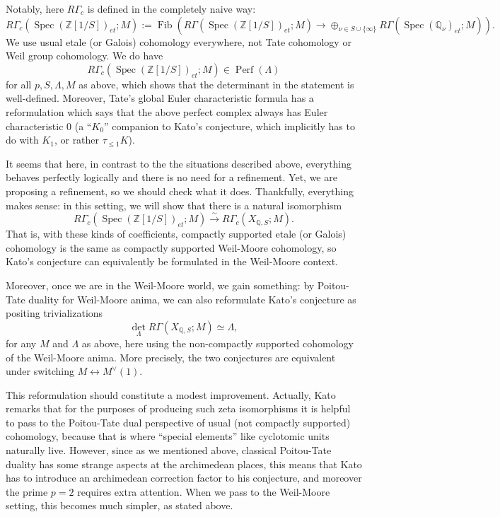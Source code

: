 \documentclass[12pt]{article}
\theoremstyle{definition}
\newcommand{\on}{\operatorname}
\newcommand{\mbb}{\mathbb}
\begin{document}
\begin{enumerate}
Notably, here $R\Gamma_c$ is defined in the completely naive way:
$$R\Gamma_c(\on{Spec}(\mbb{Z}[1/S])_{et};M) := \on{Fib}(R\Gamma (\on{Spec}(\mbb{Z}[1/S])_{et};M)\to \oplus_{\nu \in S\cup \{\infty\}} R\Gamma(\on{Spec}(\mbb{Q}_\nu)_{et};M)).$$
We use usual etale (or Galois) cohomology everywhere, not Tate cohomology or Weil group cohomology.  We do have
$$R\Gamma_c(\on{Spec}(\mbb{Z}[1/S])_{et};M)\in \on{Perf}(\Lambda)$$
for all $p,S,\Lambda,M$ as above, which shows that the determinant in the statement is well-defined.  Moreover, Tate's global Euler characteristic formula has a reformulation which says that the above perfect complex always has Euler characteristic $0$ (a ``$K_0$'' companion to Kato's conjecture, which implicitly has to do with $K_1$, or rather $\tau_{\leq 1}K$).

It seems that here, in contrast to the the situations described above, everything behaves perfectly logically and there is no need for a refinement.  Yet, we are proposing a refinement, so we should check what it does.  Thankfully, everything makes sense: in this setting, we will show that there is a natural isomorphism
$$R\Gamma_c(\on{Spec}(\mbb{Z}[1/S])_{et};M) \overset{\sim}{\rightarrow} R\Gamma_c(X_{\mbb{Q},S};M).$$
That is, with these kinds of coefficients, compactly supported etale (or Galois) cohomology is the same as compactly supported Weil-Moore cohomology, so Kato's conjecture can equivalently be formulated in the Weil-Moore context.

Moreover, once we are in the Weil-Moore world, we gain something: by Poitou-Tate duality for Weil-Moore anima, we can also reformulate Kato's conjecture as positing trivializations
$$\on{det}_\Lambda R\Gamma(X_{\mbb{Q},S};M) \simeq \Lambda,$$
for any $M$ and $\Lambda$ as above, here using the non-compactly supported cohomology of the Weil-Moore anima. More precisely, the two conjectures are equivalent under switching $M\leftrightarrow M^\vee(1)$.

This reformulation should constitute a modest improvement.  Actually, Kato remarks that for the purposes of producing such zeta isomorphisms it is helpful to pass to the Poitou-Tate dual perspective of usual (not compactly supported) cohomology, because that is where ``special elements'' like cyclotomic units naturally live.  However, since as we mentioned above, classical Poitou-Tate duality has some strange aspects at the archimedean places, this means that Kato has to introduce an archimedean correction factor to his conjecture, and moreover the prime $p=2$ requires extra attention.  When we pass to the Weil-Moore setting, this becomes much simpler, as stated above.


\end{enumerate}
\end{document}
